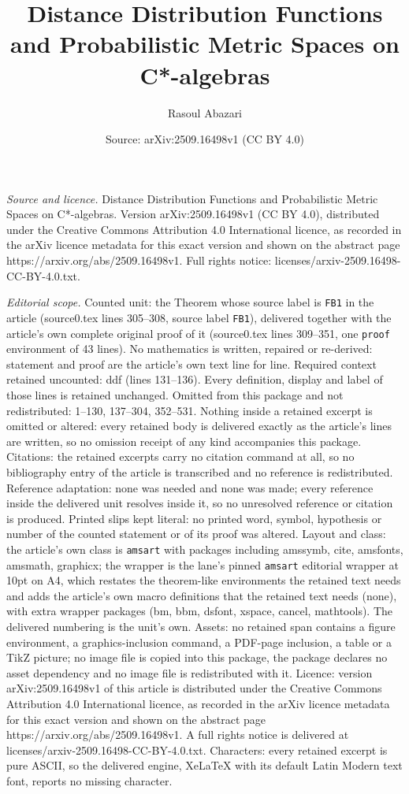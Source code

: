 \documentclass[10pt,a4paper]{amsart}
\title[Distance Distribution Functions and Probabilistic Metric Spa]{Distance Distribution Functions and Probabilistic Metric Spaces on C*-algebras}
\author{Rasoul Abazari}
\date{Source: arXiv:2509.16498v1 (CC BY 4.0)}
\begin{document}
\maketitle

\noindent\emph{Source and licence.} Distance Distribution Functions and Probabilistic Metric Spaces on C*-algebras. Version arXiv:2509.16498v1 (CC BY 4.0), distributed under the Creative Commons Attribution 4.0 International licence, as recorded in the arXiv licence metadata for this exact version and shown on the abstract page https://arxiv.org/abs/2509.16498v1. Full rights notice: licenses/arxiv-2509.16498-CC-BY-4.0.txt.\par\smallskip

\noindent\textit{Editorial scope.} Counted unit: the Theorem whose source label is \texttt{FB1} in the article (source0.tex lines 305--308, source label \texttt{FB1}), delivered together with the article's own complete original proof of it (source0.tex lines 309--351, one \texttt{proof} environment of 43 lines). No mathematics is written, repaired or re-derived: statement and proof are the article's own text line for line. Required context retained uncounted: ddf (lines 131--136). Every definition, display and label of those lines is retained unchanged. Omitted from this package and not redistributed: 1--130, 137--304, 352--531. Nothing inside a retained excerpt is omitted or altered: every retained body is delivered exactly as the article's lines are written, so no omission receipt of any kind accompanies this package. Citations: the retained excerpts carry no citation command at all, so no bibliography entry of the article is transcribed and no reference is redistributed. Reference adaptation: none was needed and none was made; every reference inside the delivered unit resolves inside it, so no unresolved reference or citation is produced. Printed slips kept literal: no printed word, symbol, hypothesis or number of the counted statement or of its proof was altered. Layout and class: the article's own class is \texttt{amsart} with packages including amssymb, cite, amsfonts, amsmath, graphicx; the wrapper is the lane's pinned \texttt{amsart} editorial wrapper at 10pt on A4, which restates the theorem-like environments the retained text needs and adds the article's own macro definitions that the retained text needs (none), with extra wrapper packages (bm, bbm, dsfont, xspace, cancel, mathtools). The delivered numbering is the unit's own. Assets: no retained span contains a figure environment, a graphics-inclusion command, a PDF-page inclusion, a table or a TikZ picture; no image file is copied into this package, the package declares no asset dependency and no image file is redistributed with it. Licence: version arXiv:2509.16498v1 of this article is distributed under the Creative Commons Attribution 4.0 International licence, as recorded in the arXiv licence metadata for this exact version and shown on the abstract page https://arxiv.org/abs/2509.16498v1. A full rights notice is delivered at licenses/arxiv-2509.16498-CC-BY-4.0.txt. Characters: every retained excerpt is pure ASCII, so the delivered engine, XeLaTeX with its default Latin Modern text font, reports no missing character.
\end{document}
